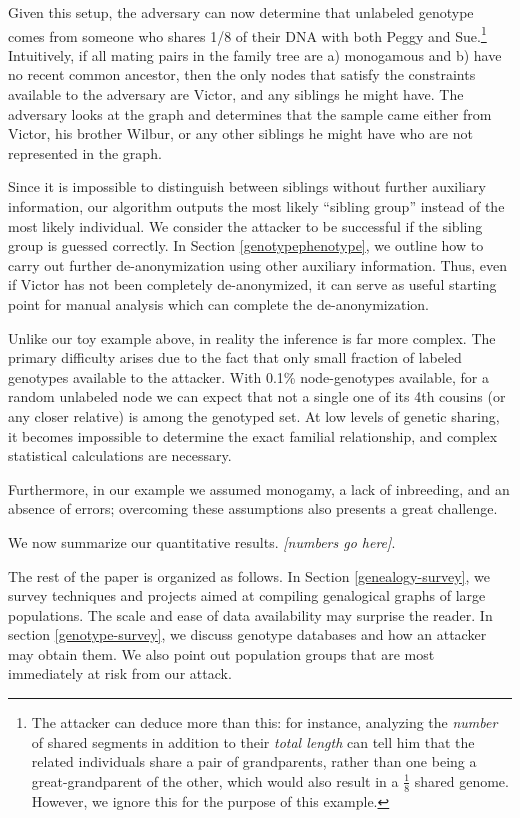 \documentclass{article}
\begin{document}
Given this setup, the adversary can now determine that unlabeled genotype comes from someone who shares 1/8 of their DNA with both Peggy and Sue.\footnote{The attacker can deduce more than this: for instance, analyzing the {\em number} of shared segments in addition to their {\em total length} can tell him that the related individuals share a pair of grandparents, rather than one being a great-grandparent of the other, which would also result in a $\frac{1}{8}$ shared genome. However, we ignore this for the purpose of this  example.} Intuitively, if all mating pairs in the family tree are a) monogamous and b) have no recent common ancestor, then the only nodes that satisfy the constraints available to the adversary are Victor, and any siblings he might have. The adversary looks at the graph and determines that the sample came either from Victor, his brother Wilbur, or any other siblings he might have who are not represented in the graph.

Since it is impossible to distinguish between siblings without further auxiliary information, our algorithm outputs the most likely ``sibling group'' instead of the most likely individual. We consider the attacker to be successful if the sibling group is guessed correctly. In Section \ref{genotypephenotype}, we outline how to carry out further de-anonymization using other auxiliary information. Thus, even if Victor has not been completely de-anonymized, it can serve as useful starting point for manual analysis which can complete the de-anonymization.

Unlike our toy example above, in reality the inference is far more complex. The primary difficulty arises due to the fact that only small fraction of labeled genotypes available to the attacker.  With 0.1\% node-genotypes available, for a random unlabeled node we can expect that not a single one of its 4th cousins (or any closer relative) is among the genotyped set.  At low levels of genetic sharing, it becomes impossible to determine the exact familial relationship, and complex statistical calculations are necessary.

Furthermore, in our example we assumed monogamy, a lack of inbreeding, and an absence of errors; overcoming these assumptions also presents a great challenge.

We now summarize our quantitative results. {\em [numbers go here]}.

The rest of the paper is organized as follows. In Section \ref{genealogy-survey}, we survey techniques and projects aimed at compiling genalogical graphs of large populations. The scale and ease of data availability may surprise the reader. In section \ref{genotype-survey}, we discuss genotype databases and how an attacker may obtain them. We also point out population groups that are most immediately at risk from our attack.
\end{document}
